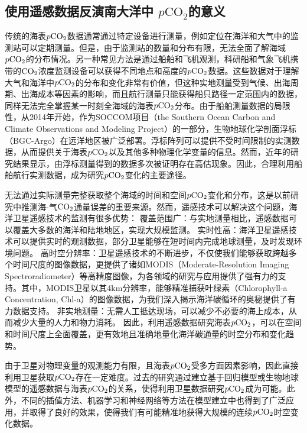 \subsection{使用遥感数据反演南大洋中 \texorpdfstring{$p\mathrm{CO_2}$}{}的意义}
传统的海表$p\rm CO_2$数据通常通过特定设备进行测量，例如定位在海洋和大气中的监测站可以定期测量。但是，由于监测站的数量和分布有限，无法全面了解海域$p\rm CO_2$的分布情况。另一种常见方法是通过船舶和飞机观测，科研船和气象飞机携带的$\rm CO_2$浓度监测设备可以获得不同地点和高度的$p\rm CO_2$数据。这些数据对于理解大气和海洋中$p\rm CO_2$的分布和变化非常有价值，但这种实地测量受到气候、出海周期、出海成本等因素的影响，而且航行测量只能获得船只路径一定范围内的数据，同样无法完全掌握某一时刻全海域的海表$p\rm CO_2$分布。由于船舶测量数据的局限性，从2014年开始，作为SOCCOM项目（the Southern Ocean Carbon and Climate Observations and Modeling Project）的一部分，生物地球化学剖面浮标（BGC-Argo）在远洋地区被广泛部署。浮标阵列可以提供不受时间限制的实测数据，从而提供关于海表$p\rm CO_2$以及其他多种物理化学变量的信息。然而，近年的研究结果显示\cite{wu2023controversial}，由浮标测量得到的数据多次被证明存在高估现象。因此，合理利用船舶航行实测数据，成为研究$p\rm CO_2$变化的主要途径。

无法通过实际测量完整获取整个海域的时间和空间$p\rm CO_2$变化和分布，这是以前研究中推测海-气$\rm CO_2$通量误差的重要来源。然而，遥感技术可以解决这个问题，海洋卫星遥感技术的监测有很多优势：
 覆盖范围广：与实地测量相比，遥感数据可以覆盖大多数的海洋和陆地地区，实现大规模监测。
 实时性高：海洋卫星遥感技术可以提供实时的观测数据，部分卫星能够在短时间内完成地球测量，及时发现环境问题。
 高时空分辨率：卫星遥感技术的不断进步，不仅使我们能够获取跨越多个时间尺度的图像数据，更提供了诸如MODIS（Moderate-Resolution Imaging Spectroradiometer）等高精度图像，为各领域的研究与应用提供了强有力的支持。其中，MODIS卫星以其4km分辨率，能够精准捕获叶绿素（Chlorophyll-a Concentration, Chl-a）的图像数据，为我们深入揭示海洋碳循环的奥秘提供了有力数据支持。
 非实地测量：无需人工抵达现场，可以减少不必要的海上成本，从而减少大量的人力和物力消耗。
因此，利用遥感数据研究海表$p\rm CO_2$，可以在空间和时间尺度上全面覆盖，更有效地且准确地量化海洋碳通量的时空分布和变化趋势。

由于卫星对物理变量的观测能力有限，且海表$p\rm CO_2$受多方面因素影响，因此直接利用卫星获取$p\rm CO_2$存在一定难度。过去的研究通过建立基于回归模型\cite{JMA_MLR,Multiple_Linear_Regression,empirical_estimate}或生物地球模型\cite{Matear_Hirst_2012}的遥感数据与海表$p\rm CO_2$的关系，使得利用卫星数据研究$p\rm CO_2$成为可能。此外，不同的插值方法\cite{2012Spatio}、机器学习\cite{machine_learning_chen_2019,machine_learning_Bennington_2022}和神经网络\cite{friedrich2009neural,HYFZ202306005}等方法在模型建立中也得到了广泛应用，并取得了良好的效果，使得我们有可能精准地获得大规模的连续$p\rm CO_2$时空变化数据。

